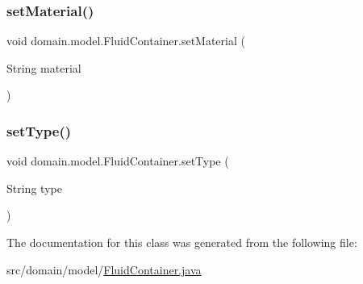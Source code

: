 \mbox{\label{classdomain_1_1model_1_1FluidContainer_a19c361d9b2401e83ee4dd5fa81ebfef3}} 
\subsubsection{\texorpdfstring{set\+Material()}{setMaterial()}}
{\footnotesize\ttfamily void domain.\+model.\+Fluid\+Container.\+set\+Material (\begin{DoxyParamCaption}\item[{String}]{material }\end{DoxyParamCaption})\hspace{0.3cm}{\ttfamily [inline]}}

\mbox{\label{classdomain_1_1model_1_1FluidContainer_ae642ca46635c455fd99130523311c47e}} 
\subsubsection{\texorpdfstring{set\+Type()}{setType()}}
{\footnotesize\ttfamily void domain.\+model.\+Fluid\+Container.\+set\+Type (\begin{DoxyParamCaption}\item[{String}]{type }\end{DoxyParamCaption})\hspace{0.3cm}{\ttfamily [inline]}}



The documentation for this class was generated from the following file\+:\begin{DoxyCompactItemize}
\item 
src/domain/model/\mbox{\hyperlink{FluidContainer_8java}{Fluid\+Container.\+java}}\end{DoxyCompactItemize}
